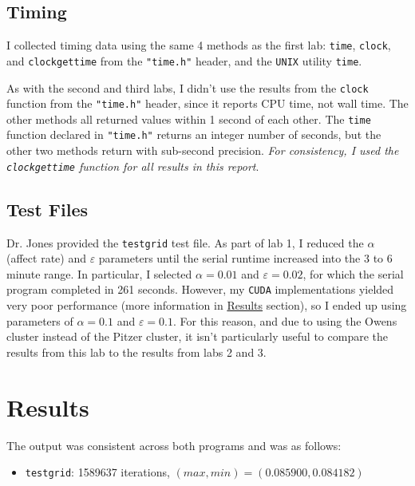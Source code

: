 \documentclass{article}
\begin{document}
\subsection*{Timing}
\label{subsec:timing}

I collected timing data using the same 4 methods as the first lab:
\texttt{time}, \texttt{clock}, and \texttt{clock\textunderscore gettime} from
the \texttt{"time.h"} header, and the \texttt{UNIX} utility \texttt{time}.

As with the second and third labs, I didn't use the results from the \texttt{clock}
function from the \texttt{"time.h"} header, since it reports CPU time, not wall
time. The other methods all returned values within 1 second of each other. The
\texttt{time} function declared in \texttt{"time.h"} returns an integer number
of seconds, but the other two methods return with sub-second precision.
\emph{For consistency, I used the \texttt{clock\textunderscore gettime}
function for all results in this report}.

\subsection*{Test Files}
\label{subsec:test_files}

Dr. Jones provided the \texttt{testgrid} test file.  As part of lab 1, I reduced the $\alpha$ (affect rate) and
$\varepsilon$ parameters until the serial runtime increased into the 3 to 6
minute range. In particular, I selected $\alpha = 0.01$ and $\varepsilon =
0.02$, for which the serial program completed in 261 seconds. However, my \texttt{CUDA}
implementations yielded very poor performance (more information in
\hyperref[sec:results]{Results} section), so I ended up using parameters of
$\alpha = 0.1$ and $\varepsilon = 0.1$.  For this reason, and due to using the
Owens cluster instead of the Pitzer cluster, it isn't particularly useful to
compare the results from this lab to the results from labs 2 and 3.

\newpage
\section*{Results}
\label{sec:results}

The output was consistent across both programs and was as follows:
\begin{itemize}
    \item \texttt{testgrid}: 1589637 iterations, $(max, min) = (0.085900, 0.084182)$
\end{itemize}
\end{document}
